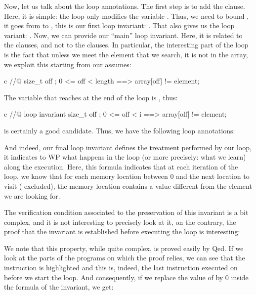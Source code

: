Now, let us talk about the loop annotations. The first step is to add the
 clause. Here, it is simple: the loop only modifies the
variable . Thus, we need to bound , it goes from
 to , this is our first loop invariant:
. That also gives us the loop variant:
. Now, we can provide our ``main'' loop invariant. Here,
it is related to the  clauses, and not to the
 clauses. In particular, the interesting part of the loop is
the fact that unless we meet the element that we search, it is not in the array,
we exploit this starting from our  assumes:
\begin{CodeBlock}{c}
  //@ \forall size_t off ; 0 <= off < length ==> array[off] != element;
\end{CodeBlock}
The variable that reaches  at the end of the loop is
, thus:
\begin{CodeBlock}{c}
  //@ loop invariant \forall size_t off ; 0 <= off < i ==> array[off] != element;
\end{CodeBlock}
is certainly a good candidate. Thus, we have the following loop annotations:




And indeed, our final loop invariant defines the treatment performed by our
loop, it indicates to WP what happens in the loop (or more precisely: what we
learn) along the execution. Here, this formula indicates that at each iteration
of the loop, we know that for each memory location between 0 and the next
location to visit ( excluded), the memory location contains a
value different from the element we are looking for.


The verification condition associated to the preservation of this invariant is
a bit complex, and it is not interesting to precisely look at it,
on the contrary, the proof that the invariant is established before
executing the loop is interesting:




We note that this property, while quite complex, is proved easily
by Qed. If we look at the parts of the programs on which the proof
relies, we can see that the instruction  is highlighted
and this is, indeed, the last instruction executed on  before
we start the loop. And consequently, if we replace the value of
 by 0 inside the formula of the invariant, we get:


